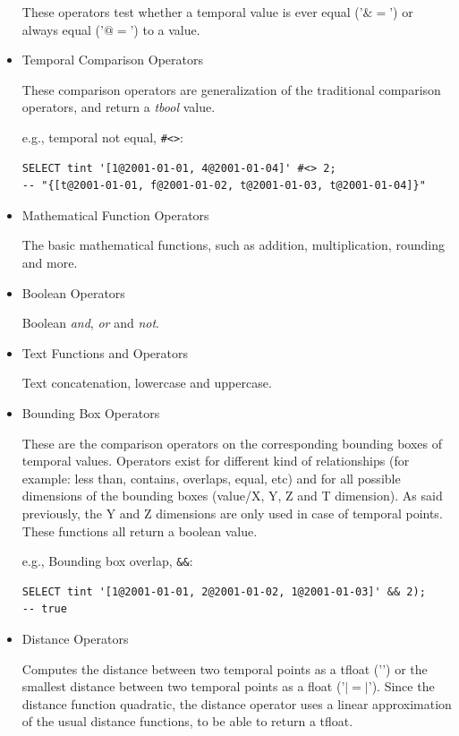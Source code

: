\begin{itemize}
        These operators test whether a temporal value is ever equal ('$\&=$') or always equal ('$@=$') to a value.

    \item Temporal Comparison Operators

        These comparison operators are generalization of the traditional comparison operators, and return a \textit{tbool} value.

        e.g., temporal not equal, \lstinline{#<>}:
        \begin{lstlisting}
SELECT tint '[1@2001-01-01, 4@2001-01-04]' #<> 2;
-- "{[t@2001-01-01, f@2001-01-02, t@2001-01-03, t@2001-01-04]}"
        \end{lstlisting}

    \item Mathematical Function Operators

        The basic mathematical functions, such as addition, multiplication, rounding and more.

    \item Boolean Operators

        Boolean \textit{and}, \textit{or} and \textit{not}.

    \item Text Functions and Operators

        Text concatenation, lowercase and uppercase.

    \item Bounding Box Operators

        These are the comparison operators on the corresponding bounding boxes of temporal values. Operators exist for different kind of relationships (for example: less than, contains, overlaps, equal, etc) and for all possible dimensions of the bounding boxes (value/X, Y, Z and T dimension). As said previously, the Y and Z dimensions are only used in case of temporal points. These functions all return a boolean value.

        e.g., Bounding box overlap, \lstinline{&&}:
        \begin{lstlisting}
SELECT tint '[1@2001-01-01, 2@2001-01-02, 1@2001-01-03]' && 2);
-- true
        \end{lstlisting}

    \item Distance Operators

        Computes the distance between two temporal points as a tfloat ('\(<->\)') or the smallest distance between two temporal points as a float ('\(|=|\)'). Since the distance function quadratic, the distance operator uses a linear approximation of the usual distance functions, to be able to return a tfloat.


\end{itemize}
